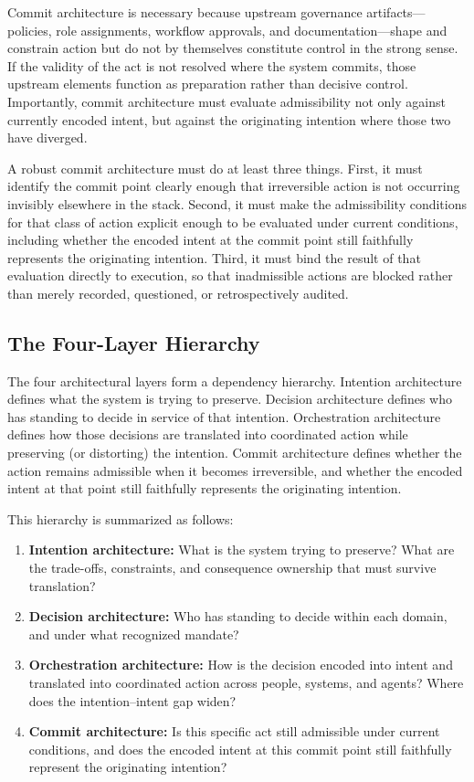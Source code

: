 \documentclass[12pt]{article}
\begin{document}
Commit architecture is necessary because upstream governance artifacts---
policies, role assignments, workflow approvals, and documentation---shape and
constrain action but do not by themselves constitute control in the strong
sense. If the validity of the act is not resolved where the system commits,
those upstream elements function as preparation rather than decisive control.
Importantly, commit architecture must evaluate admissibility not only against
currently encoded intent, but against the originating intention where those
two have diverged.

A robust commit architecture must do at least three things. First, it must
identify the commit point clearly enough that irreversible action is not
occurring invisibly elsewhere in the stack. Second, it must make the
admissibility conditions for that class of action explicit enough to be
evaluated under current conditions, including whether the encoded intent at
the commit point still faithfully represents the originating intention. Third,
it must bind the result of that evaluation directly to execution, so that
inadmissible actions are blocked rather than merely recorded, questioned, or
retrospectively audited.

\subsection{The Four-Layer Hierarchy}

The four architectural layers form a dependency hierarchy. Intention
architecture defines what the system is trying to preserve. Decision
architecture defines who has standing to decide in service of that intention.
Orchestration architecture defines how those decisions are translated into
coordinated action while preserving (or distorting) the intention. Commit
architecture defines whether the action remains admissible when it becomes
irreversible, and whether the encoded intent at that point still faithfully
represents the originating intention.

This hierarchy is summarized as follows:

\begin{enumerate}
  \item \textbf{Intention architecture:} What is the system trying to
    preserve? What are the trade-offs, constraints, and consequence ownership
    that must survive translation?
  \item \textbf{Decision architecture:} Who has standing to decide within
    each domain, and under what recognized mandate?
  \item \textbf{Orchestration architecture:} How is the decision encoded into
    intent and translated into coordinated action across people, systems, and
    agents? Where does the intention--intent gap widen?
  \item \textbf{Commit architecture:} Is this specific act still admissible
    under current conditions, and does the encoded intent at this commit point
    still faithfully represent the originating intention?
\end{enumerate}
\end{document}
